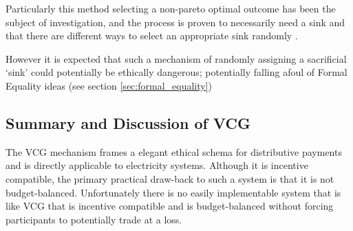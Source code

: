 Particularly this method selecting a non-pareto optimal outcome has been the subject of investigation, and the process is proven to necessarily need a sink and that there are different ways to select an appropriate sink randomly \cite{NATH2019673}.

However it is expected that such a mechanism of randomly assigning a sacrificial `sink' could potentially be ethically dangerous; potentially falling afoul of Formal Equality ideas (see section \ref{sec:formal_equality})







\subsection{Summary and Discussion of VCG}\label{subsec:summary_discussion_VCG}

The VCG mechanism frames a elegant ethical schema for distributive payments and is directly applicable to electricity systems.
Although it is incentive compatible, the primary practical draw-back to such a system is that it is not budget-balanced.
Unfortunately there is no easily implementable system that is like VCG that is incentive compatible and is budget-balanced without forcing participants to potentially trade at a loss.

